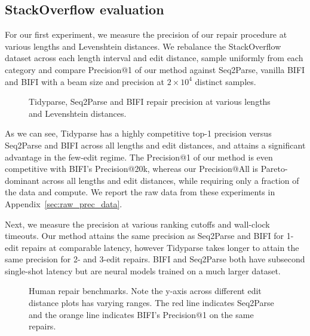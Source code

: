\documentclass[sigplan,acmsmall,nonacm,screen]{acmart}\settopmatter{printfolios=false,printccs=false,printacmref=false}
\begin{document}
  \clearpage\subsection{StackOverflow evaluation}\label{sec:rq2}

  For our first experiment, we measure the precision of our repair procedure at various lengths and Levenshtein distances. We rebalance the StackOverflow dataset across each length interval and edit distance, sample uniformly from each category and compare Precision@1 of our method against Seq2Parse, vanilla BIFI and BIFI with a beam size and precision at $2\times10^4$ distinct samples.

  \begin{figure}[h!]
    \resizebox{.24\textwidth}{!}{}
    \resizebox{.24\textwidth}{!}{}
    \resizebox{.24\textwidth}{!}{}
    \resizebox{.24\textwidth}{!}{}
    \caption{Tidyparse, Seq2Parse and BIFI repair precision at various lengths and Levenshtein distances.}\label{fig:len_dist_prec}
  \end{figure}

  As we can see, Tidyparse has a highly competitive top-1 precision versus Seq2Parse and BIFI across all lengths and edit distances, and attains a significant advantage in the few-edit regime. The Precision@1 of our method is even competitive with BIFI's Precision@20k, whereas our Precision@All is Pareto-dominant across all lengths and edit distances, while requiring only a fraction of the data and compute. We report the raw data from these experiments in Appendix~\ref{sec:raw_prec_data}.

  Next, we measure the precision at various ranking cutoffs and wall-clock timeouts. Our method attains the same precision as Seq2Parse and BIFI for 1-edit repairs at comparable latency, however Tidyparse takes longer to attain the same precision for 2- and 3-edit repairs. BIFI and Seq2Parse both have subsecond single-shot latency but are neural models trained on a much larger dataset.

  \begin{figure}[h!]
    \resizebox{.24\textwidth}{!}{}
    \resizebox{.24\textwidth}{!}{}
    \resizebox{.24\textwidth}{!}{}
    \resizebox{.24\textwidth}{!}{}
    \caption{Human repair benchmarks. Note the y-axis across different edit distance plots has varying ranges. The red line indicates Seq2Parse and the orange line indicates BIFI's Precision@1 on the same repairs.}\label{fig:human}
  \end{figure}
\end{document}
